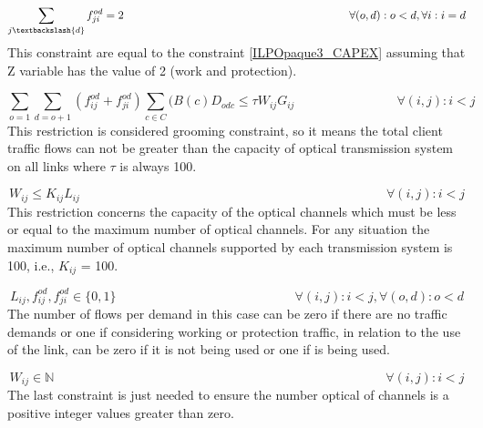 \begin{equation}
\sum_{j\textbackslash \{d\}} f_{ji}^{od} = 2  \qquad \qquad \qquad \qquad \qquad \qquad \qquad \qquad \qquad \qquad
\forall(o,d) : o < d, \forall i: i = d
\label{ILPOpaque3}
\end{equation}
\noindent
This constraint are equal to the constraint \ref{ILPOpaque3_CAPEX} assuming that Z variable has the value of 2 (work and protection).

\begin{equation}
\sum_{o=1} \sum_{d=o+1} \left(f_{ij}^{od} + f_{ji}^{od}\right) \sum_{c\in C} (B\left(c\right) D_{odc}\leq \tau W_{ij} G_{ij} \qquad \qquad \qquad \qquad
\forall(i,j) : i < j
\label{ILPOpaque4}
\end{equation}
\noindent
This restriction is considered grooming constraint, so it means the total client traffic flows can not be greater than the capacity of optical transmission system on all links where $\tau$ is always 100.

\begin{equation}
W_{ij} \leq K_{ij} L_{ij} \qquad \qquad \qquad \qquad \qquad \qquad \qquad \qquad \qquad \qquad \qquad \qquad \forall(i,j) : i < j
\label{ILPOpaque5}
\end{equation}
\noindent
This restriction concerns the capacity of the optical channels which must be less or equal to the maximum number of optical channels. For any situation the maximum number of optical channels supported by each transmission system is 100, i.e., $K_{ij}$ = 100.

\begin{equation}
L_{ij} , f_{ij}^{od} , f_{ji}^{od} \in \{0,1\} \qquad \qquad \qquad \qquad \qquad \qquad \qquad
\forall(i,j) : i < j, \forall(o,d) : o < d
\label{ILPOpaque6}
\end{equation}
\noindent
The number of flows per demand in this case can be zero if there are no traffic demands or one if considering working or protection traffic, in relation to the use of the link, can be zero if it is not being used or one if is being used.

\begin{equation}
W_{ij} \in \mathbb{N}  \qquad \qquad \qquad \qquad \qquad \qquad \qquad \qquad \qquad \qquad \qquad \qquad \qquad
\forall(i,j) : i < j\label{ILPOpaque7}
\end{equation}
\noindent
The last constraint is just needed to ensure the number optical of channels is a positive integer values greater than zero.

